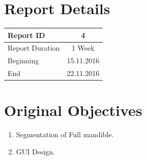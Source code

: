 \documentclass[11.5pt, b5paper]{article}
\begin{document}
\title{\rmfamily\normalfont{}}

\author{{\small Automatic Mandible Segmentation Using VTK}}

\date{\footnotesize{\today}}

\maketitle

% 
 


\section{Report Details}
\begin{center}
\begin{tabular}{ l | c }
\hline 
Report ID & 4   \\ %
\hline 
Report Duration & 1 Week \\ %
\hline 
Beginning & 15.11.2016 \\ %
\hline 
End & 22.11.2016 \\ %
\hline 
\end{tabular}
\end{center}

\section{Original Objectives}
\begin{enumerate}
\item Segmentation of Full mandible.
\item GUI Design.
\end{enumerate}
\end{document}
